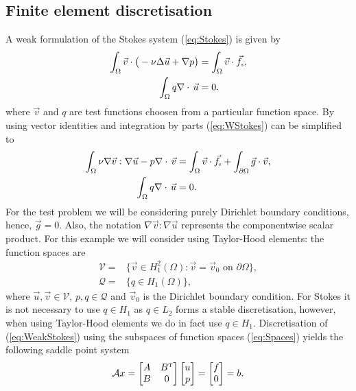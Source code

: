 \documentclass[11pt]{article}
\numberwithin{equation}{section}    %
\renewcommand{\div}{\nabla\cdot\,}
\newcommand{\U}{\vec u}
\newcommand{\V}{\vec v}
\newcommand{\Fs}{\vec{f}_{\mbox{\tiny s}}}
\begin{document}
\subsection{Finite element discretisation} \label{sec:discretisation}

A weak formulation of the Stokes system (\ref{eq:Stokes}) is given by
\begin{equation} \label{eq:WStokes}
    \begin{aligned}
       \int_{\Omega}\V \cdot \big(-\nu \Delta \U+ \nabla p\big) &= \int_{\Omega} \V \cdot \Fs,\\
        \int_{\Omega} q\div \U     &= 0.
    \end{aligned}
\end{equation}
where $\V$ and $q$ are test functions choosen from a particular function space. By using vector identities and integration by parts (\ref{eq:WStokes}) can be simplified to
\begin{equation} \label{eq:WeakStokes}
    \begin{aligned}
       \int_{\Omega}\nu \nabla  \V : \nabla  \U- p \div \V &= \int_{\Omega} \V \cdot \Fs + \int_{\partial \Omega} \vec g \cdot \V,\\
        \int_{\Omega} q\div \U     &= 0.
    \end{aligned}
\end{equation}
For the test problem we will be considering purely Dirichlet boundary conditions, hence, $\vec g = 0$. Also, the notation $\nabla  \V : \nabla  \U$ represents the componentwise scalar product. For this example we will consider using Taylor-Hood elements: the function spaces are
\begin{equation} \label{eq:Spaces}
    \begin{aligned}
      \mathcal{V} =& \{\V \in H_1^2 (\Omega): \V = \vec v_0 \mbox{ on } \partial \Omega  \},\\
      \mathcal{Q} =& \{q\in H_1 (\Omega)\},
    \end{aligned}
\end{equation}
where $\U,\V \in \mathcal{V}$, $p,q\in \mathcal{Q}$ and $\vec v_0 $ is the Dirichlet boundary condition. For Stokes it is not necessary to use $q\in H_1$ as $q\in L_2$ forms a stable discretisation, however, when using Taylor-Hood elements we do in fact use $q\in H_1$. Discretisation  of (\ref{eq:WeakStokes}) using the subspaces of function spaces (\ref{eq:Spaces}) yields the following saddle point system
\begin{equation} \label{eq:system}
    \mathcal{A}x = \begin{bmatrix}
    A & B^{\mbox{\tiny{T}}}\\
    B & 0\\
    \end{bmatrix}
    \begin{bmatrix}
    u \\
    p \\
    \end{bmatrix} =
    \begin{bmatrix}
    f\\
    0 \\
    \end{bmatrix}=b.
\end{equation}
\end{document}
